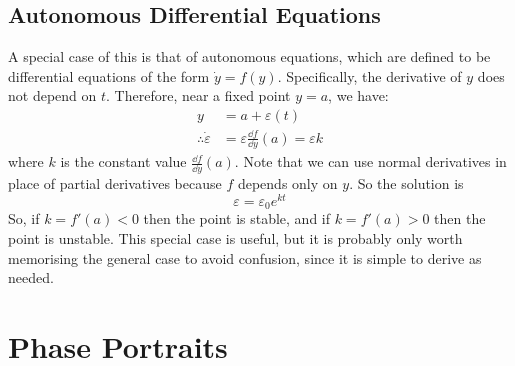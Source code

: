 \documentclass{article}
\begin{document}
\subsection{Autonomous Differential Equations}
A special case of this is that of autonomous equations, which are defined to be differential equations of the form $\dot y = f(y)$. Specifically, the derivative of $y$ does not depend on $t$. Therefore, near a fixed point $y=a$, we have:
\begin{align*}
    y                         & = a + \varepsilon(t)                                   \\
    \therefore\dot\varepsilon & = \varepsilon \frac{\dd{f}}{\dd{y}}(a) = \varepsilon k
\end{align*}
where $k$ is the constant value $\frac{\dd{f}}{\dd{y}}(a)$. Note that we can use normal derivatives in place of partial derivatives because $f$ depends only on $y$. So the solution is
\[ \varepsilon = \varepsilon_0 e^{kt} \]
So, if $k = f'(a) < 0$ then the point is stable, and if $k = f'(a) > 0$ then the point is unstable. This special case is useful, but it is probably only worth memorising the general case to avoid confusion, since it is simple to derive as needed.

\section{Phase Portraits}
\end{document}
